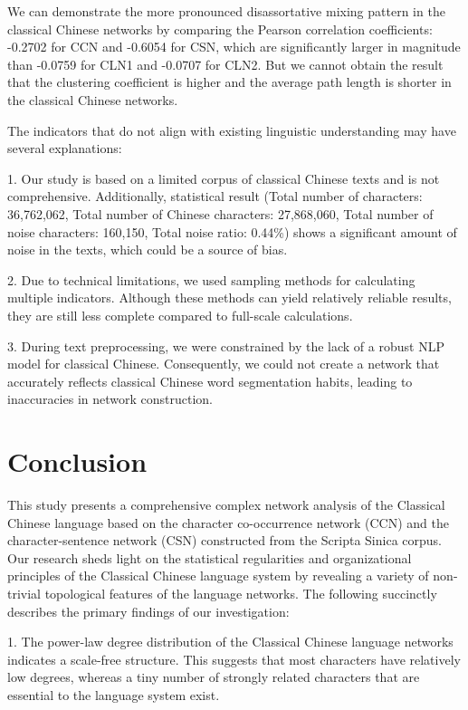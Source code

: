 \documentclass[11pt]{article}
\begin{document}
We can demonstrate the more pronounced disassortative mixing pattern in the classical Chinese networks by comparing the Pearson correlation coefficients: -0.2702 for CCN and -0.6054 for CSN, which are significantly larger in magnitude than -0.0759 for CLN1 and -0.0707 for CLN2.  But we cannot obtain the result that the clustering coefficient is higher and the average path length is shorter in the classical Chinese networks. 

The indicators that do not align with existing linguistic understanding may have several explanations:

1. Our study is based on a limited corpus of classical Chinese texts and is not comprehensive. Additionally, statistical result (Total number of characters: 36,762,062, Total number of Chinese characters: 27,868,060, Total number of noise characters: 160,150, Total noise ratio: 0.44\%) shows a significant amount of noise in the texts, which could be a source of bias.

2. Due to technical limitations, we used sampling methods for calculating multiple indicators. Although these methods can yield relatively reliable results, they are still less complete compared to full-scale calculations.

3. During text preprocessing, we were constrained by the lack of a robust NLP model for classical Chinese. Consequently, we could not create a network that accurately reflects classical Chinese word segmentation habits, leading to inaccuracies in network construction.
\section{Conclusion}
This study presents a comprehensive complex network analysis of the Classical Chinese language based on the character co-occurrence network (CCN) and the character-sentence network (CSN) constructed from the Scripta Sinica corpus. Our research sheds light on the statistical regularities and organizational principles of the Classical Chinese language system by revealing a variety of non-trivial topological features of the language networks. The following succinctly describes the primary findings of our investigation:

1. The power-law degree distribution of the Classical Chinese language networks indicates a scale-free structure. This suggests that most characters have relatively low degrees, whereas a tiny number of strongly related characters that are essential to the language system exist.
\end{document}
